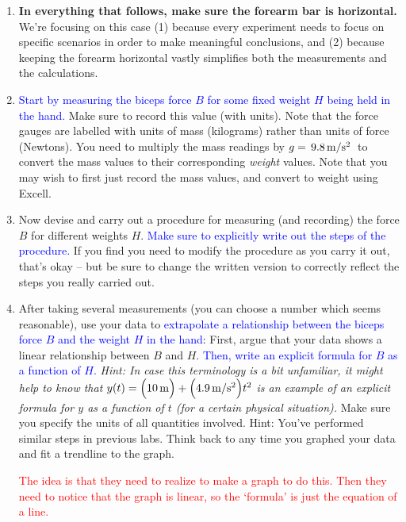 \documentclass[11pt,letterpaper]{article}
\newcommand{\question}[2][blue]{\textcolor{#1}{#2}}
\newcommand{\answer}[2][red]{\textcolor{#1}{#2}}
\begin{document}
\begin{enumerate}[series=labproc,label={\bf \arabic*.}]

\item
{\bf In everything that follows, make sure the forearm bar is horizontal.}
We're focusing on this case 
(1) because every experiment needs to focus on specific scenarios in order to 
make meaningful conclusions,
and (2) because keeping the forearm horizontal vastly simplifies both the
measurements and the calculations.

\item
\question{Start by measuring the biceps force $B$ 
for some fixed weight $H$ being held in the hand.}
Make sure to record this value (with units).
Note that the force gauges are labelled with units of mass (kilograms) rather
than units of force (Newtons).  
You need to multiply the mass readings by $g=\, 9.8 \,\mathrm{ m/s^2 }\,$ 
to convert the mass values to
their corresponding \emph{weight} values.  Note that you may wish to first just
record the mass values, and convert to weight using Excell.

\item
Now devise and carry out a procedure for measuring (and recording)
the force $B$ for different weights $H$.  
\question{Make sure to explicitly write out the steps of the procedure.}
If you find you need to modify the procedure as you carry it out,
that's okay -- but be sure to change the written version to correctly
reflect the steps you really carried out.

\item
After taking several measurements (you can choose a number which seems
reasonable), use your data to 
\question{extrapolate a relationship between the biceps
force $B$ and the weight $H$ in the hand}:
First, argue that your data shows a linear relationship between $B$ and $H$.
\question{Then, write an explicit formula for $B$ as a function of $H$.}
\emph{Hint:  In case this terminology is a bit unfamiliar, 
it might help to know that
$y(t) = \Bigl( 10\,\mathrm{m} \Bigr) +\Bigl( 4.9\,\mathrm{m/s^2} \Bigr)t^2$ 
is an example of an explicit formula 
for $y$ as a function of $t$ (for a certain physical situation).}
Make sure you specify the units of all quantities involved.
Hint:  You've performed similar steps in previous labs.
Think back to any time you graphed your data 
and fit a trendline to the graph.

\answer{The idea is that they need to realize to make a graph to do this.
	Then they need to notice that the graph is linear,
	so the `formula' is just the equation of a line.
}


\end{enumerate}
\end{document}
